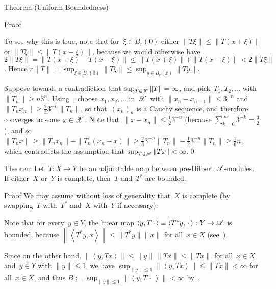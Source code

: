 \documentclass[a]{subfiles}
\begin{document}
\begin{parsec}
\begin{point}[pub]{Theorem (Uniform Boundedness)}
\begin{point}{Proof}
\begin{point}
To see why this is true,
note that for~$\xi\in B_r(0)$
either $\|T\xi\|\leq \|T(x+\xi)\|$
or $\|T\xi\|\leq \|T(x-\xi)\|$,
because we would otherwise have
$2\|T\xi\| = \|T(x+\xi)-T(x-\xi)\|
\leq \|T(x+\xi)\|+\|T(x-\xi)\|<2\|T\xi\|$.
Hence
$r\|T\|=\sup_{\xi\in B_r(0)} \|T\xi\|\leq  
\sup_{y\in B_r(x)} \|Ty\|$.
\end{point}
\begin{point}%
Suppose towards a contradiction
that $\sup_{T\in\mathscr{F}}\|T\|=\infty$,
and pick~$T_1,T_2,\dotsc$ with $\|T_n\|\geq n3^{n}$.
Using~,
choose $x_1,x_2,\dotsc$ in~$\mathscr{X}$
with $\|x_{n}-x_{n-1}\|\leq 3^{-n}$
and~$\|T_{n} x_{n}\|\geq \frac{2}{3}3^{-n}\|T_{n}\|$,
so that~$(x_n)_n$ is a Cauchy sequence, 
and therefore converges to some
$x\in\mathscr{X}$.
Note that~$\|x-x_n\|\leq \frac{1}{2}3^{-n}$
(because $\sum_{k=0}^\infty 3^{-k}=\frac{3}{2}$),
and so $\|T_n x\|\geq  \|T_nx_n\| - \|T_n(x_n-x)\|
\geq \frac{2}{3}3^{-n}\|T_n\|-\frac{1}{2}3^{-n}\|T_n\|
\geq \frac{1}{6}n$,
which contradicts
the assumption that $\sup_{T\in \mathscr{F}} \|Tx\| <\infty$.\qed
\end{point}
\end{point}
\end{point}
\begin{point}{Theorem}%
Let~$T\colon X\to Y$ be an adjointable map
between pre-Hilbert $\mathscr{A}$-modules.
If either~$X$ or~$Y$ is complete,
then~$T$ and~$T^*$ are bounded.
\begin{point}{Proof}%
We may assume without loss of generality
that~$X$ is complete (by swapping~$T$ with~$T^*$
and~$X$ with~$Y$ if necessary).

Note that for every~$y\in Y$,
the linear map $\left<y,T\,\cdot\,\right>\equiv
\left<T^*y,\,\cdot\,\right>\colon Y\to \mathscr{A}$
is bounded,
because $\left\|\left<T^*y,x\right>\right\| \leq \|T^*y\|\|x\|$
for all~$x\in X$ (see~).

Since 
on the other hand,
$\left\|\left<y,Tx\right>\right\|
\leq \|y\|\,\|Tx\|\leq \|Tx\|$
for all~$x\in X$ and~$y\in Y$ with $\|y\|\leq 1$,
we have $\sup_{\|y\|\leq 1} \|\left<y,Tx\right>\| \leq \|Tx\|<\infty$
for all~$x\in X$,
and thus $B:=\sup_{\|y\|\leq 1} \|\left<y,T\,\cdot\,\right>\|<\infty$
by~.


\end{point}
\end{point}
\end{parsec}
\end{document}
